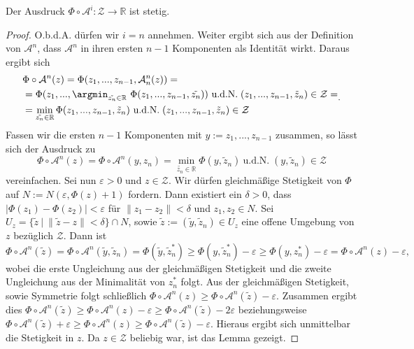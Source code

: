 \begin{lemma}
	Der Ausdruck $\Phi \circ \mathcal{A}^i: \mathcal{Z} \rightarrow \mathbb{R}$ ist stetig.
\end{lemma}
\begin{proof}
	O.b.d.A. dürfen wir $i = n$ annehmen. Weiter ergibt sich aus der Definition von $\mathcal{A}^n$, dass $\mathcal{A}^n$ in ihren ersten $n-1$ Komponenten als Identität wirkt. Daraus ergibt sich $$
	\begin{aligned}	
		&\Phi \circ \mathcal{A}^n(z) = \Phi(z_1,...,z_{n-1},\mathcal{A}^n_n(z)) = \\
		&= \Phi(z_1,...,\argmin_{\tilde{z_n} \in \mathbb{R}} \
		 \Phi(z_1,...,z_{n-1},\tilde{z_n})) \
		 \text{u.d.N.} \;  (z_1,...,z_{n-1},\tilde{z}_n) \in \mathcal{Z} = \\
		&= \min_{\tilde{z_n} \in \mathbb{R} } \Phi(z_1,...,z_{n-1},\tilde{z}_n) \
		\text{u.d.N.} \;  (z_1,...,z_{n-1},\tilde{z}_n) \in \mathcal{Z}
 	\end{aligned}.
	$$ 
	Fassen wir die ersten $n-1$ Komponenten mit $y := z_1,...,z_{n-1}$ zusammen, so lässt sich der Ausdruck zu 
	\begin{equation}
	\label{cd-schritt-a1}
	\Phi \circ \mathcal{A}^n(z) = \Phi \circ \mathcal{A}^n(y,z_n) = 
	\min_{\tilde{z_n} \in \mathbb{R} } \Phi(y,\tilde{z}_n) \
	\text{u.d.N.} \;  (y,\tilde{z}_n) \in \mathcal{Z}
	\end{equation}
	vereinfachen. 
	Sei nun $\varepsilon > 0$ und $z \in \mathcal{Z}$.
	Wir dürfen  gleichmäßige Stetigkeit von $\Phi$ auf $N := N(\varepsilon,\Phi(z)+1)$ fordern. Dann existiert ein $\delta > 0$, dass $|\Phi(z_1)-\Phi(z_2)| < \varepsilon$ für $\|z_1-z_2\| < \delta$ und $z_1,z_2 \in N$. Sei $U_z = \{\tilde{z} \ | \ \|\tilde{z}-z\| < \delta \} \cap N$, sowie $\tilde{z} := (\tilde{y},\tilde{z}_n) \in U_z$ eine offene Umgebung von $z$ bezüglich $\mathcal{Z}$.
	Dann ist 
	$$
	\Phi \circ \mathcal{A}^n(\tilde{z}) = \Phi \circ \mathcal{A}^n (\tilde{y},\tilde{z}_n) = 
	\Phi(\tilde{y},\tilde{z}^*_n) \geq \Phi(y,\tilde{z}^*_n) - \varepsilon \geq \Phi(y,z^*_n) - \varepsilon = \Phi \circ \mathcal{A}^n(z) - \varepsilon,
	$$
	wobei die erste Ungleichung aus der gleichmäßigen Stetigkeit und die zweite Ungleichung aus der Minimalität von $z^*_n$ folgt. Aus der gleichmäßigen Stetigkeit, sowie Symmetrie folgt schließlich 
	$\Phi \circ \mathcal{A}^n(z) \geq \Phi \circ \mathcal{A}^n(\tilde{z}) - \varepsilon$. Zusammen ergibt dies $\Phi \circ \mathcal{A}^n(\tilde{z}) \geq \Phi \circ \mathcal{A}^n(z) - \varepsilon \geq \Phi \circ \mathcal{A}^n(\tilde{z}) - 2\varepsilon$ beziehungsweise $\Phi \circ \mathcal{A}^n(\tilde{z}) + \varepsilon \geq \Phi \circ \mathcal{A}^n(z) \geq \Phi \circ \mathcal{A}^n(\tilde{z}) - \varepsilon$. Hieraus ergibt sich unmittelbar die Stetigkeit in $z$. Da $z \in \mathcal{Z}$ beliebig war, ist das Lemma gezeigt.
\end{proof}

